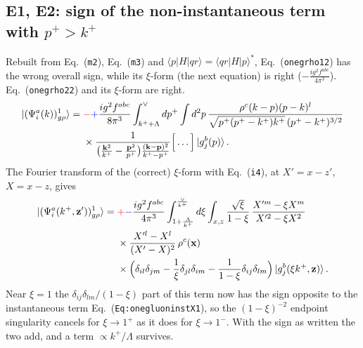 \documentclass[10pt]{article}
\def\v#1{\mathbf{#1}}
\newcommand{\old}[1]{{\color{red}#1}}
\newcommand{\new}[1]{{\color{blue}#1}}
\newcommand{\eqn}[1]{Eq.~(\texttt{#1})}
\begin{document}
\subsection{E1, E2: sign of the non-instantaneous term with $p^+>k^+$}
Rebuilt from \eqn{m2}, \eqn{m3} and $\langle p|H|qr\rangle=\langle qr|H|p\rangle^*$, \eqn{onegrho12} has the wrong overall sign, while its $\xi$-form (the next equation) is right ($-\frac{ig^2f^{abc}}{4\pi^3}$). \eqn{onegrho22} and its $\xi$-form are right.
\begin{align}
\ket{(\Psi^a_i(k))^1_{g\rho}}={}&\old{-}\new{+}\frac{ig^2f^{abc}}{8\pi^3}\int_{k^++\Lambda}^{\vee}dp^+\int d^2p\,\frac{\rho^c(k-p)(p-k)^l}{\sqrt{p^+(p^+-k^+)k^+}\,(p^+-k^+)^{3/2}}\notag\\
&\times\frac{1}{\big(\frac{\v k^2}{k^+}-\frac{\v p^2}{p^+}\big)\frac{(\v k-\v p)^2}{k^+-p^+}}\Big[\dots\Big]\ket{g^b_j(p)}.
\end{align}
The Fourier transform of the (correct) $\xi$-form with \eqn{i4}, at $X'=x-z'$, $X=x-z$, gives
\begin{align}
\ket{(\Psi^a_i(k^+,\v z'))^1_{g\rho}}={}&\old{+}\new{-}\frac{ig^2f^{abc}}{4\pi^3}\int_{1+\frac{\Lambda}{k^+}}^{\frac{\vee}{k^+}}d\xi\int_{x,z}\frac{\sqrt\xi}{1-\xi}\,\frac{X'^m-\xi X^m}{X'^2-\xi X^2}\notag\\
&\times\frac{X'^l-X^l}{(X'-X)^2}\,\rho^c(\v x)\notag\\
&\times\Big(\delta_{il}\delta_{jm}-\frac1\xi\delta_{jl}\delta_{im}-\frac{1}{1-\xi}\delta_{ij}\delta_{lm}\Big)\ket{g^b_j(\xi k^+,\v z)}.
\end{align}
Near $\xi=1$ the $\delta_{ij}\delta_{lm}/(1-\xi)$ part of this term now has the sign opposite to the instantaneous term \eqn{Eq:onegluoninstX1}, so the $(1-\xi)^{-2}$ endpoint singularity cancels for $\xi\to1^+$ as it does for $\xi\to1^-$. With the sign as written the two add, and a term $\propto k^+/\Lambda$ survives.
\end{document}
